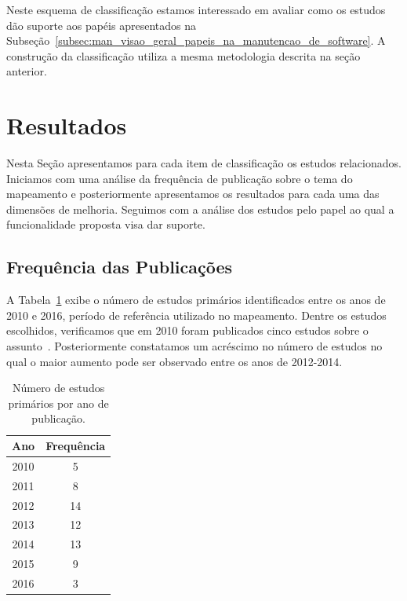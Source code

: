 Neste esquema de classificação estamos interessado em avaliar como os estudos
dão suporte aos papéis apresentados na
Subseção~\ref{subsec:man_visao_geral_papeis_na_manutencao_de_software}. A
construção da classificação utiliza a mesma metodologia descrita na seção
anterior.

\section{Resultados}
\label{sec:mapeamento_resultados}

Nesta Seção apresentamos para cada item de classificação os estudos
relacionados. Iniciamos com uma análise da frequência de publicação sobre o tema
do mapeamento e posteriormente apresentamos os resultados para cada uma das
dimensões de melhoria. Seguimos com a análise dos estudos pelo papel ao qual a
funcionalidade proposta visa dar suporte.

\subsection{Frequência das Publicações}
\label{sub:frequencia_publicacao}

A Tabela~\ref{tab:publicacao_por_ano} exibe o número de estudos primários
identificados entre os anos de 2010 e 2016, período de referência utilizado no
mapeamento. Dentre os estudos escolhidos, verificamos que em 2010 foram
publicados cinco estudos sobre o assunto~\cite{sun2010discriminative,
	gegick2010identifying, song2010jdf, nagwani2010predictive,
	zimmermann2010makes}. Posteriormente constatamos um acréscimo no número de
estudos no qual o maior aumento pode ser observado entre os anos de
2012\@-\@2014.

\begin{table}[htpb]
\centering
\begin{tabular}{@{}cc@{}}
\toprule
\multicolumn{1}{l}{\textbf{Ano}} & \textbf{Frequência} \\ \midrule
2010 & 5 \\
2011 & 8 \\
2012 & 14 \\
2013 & 12 \\
2014 & 13 \\
2015 & 9 \\
2016 & 3 \\ \bottomrule
\end{tabular}
\caption{Número de estudos primários por ano de publicação.}
\label{tab:publicacao_por_ano}
\end{table}

